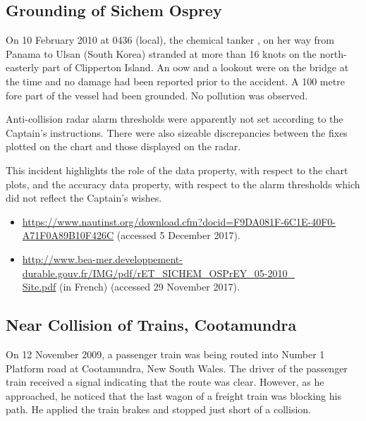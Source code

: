 \subsection{Grounding of Sichem Osprey} \label{bkm:incacc:sichemosprey}
On 10 February 2010 at 0436 (local), the chemical tanker , on her way from Panama to Ulsan (South Korea) stranded at more than 16 knots on the north-easterly part of Clipperton Island. An \gls{oow} and a lookout were on the bridge at the time and no damage had been reported prior to the accident. A 100 metre fore part of the vessel had been grounded. No pollution was observed.

Anti-collision radar alarm thresholds were apparently not set according to the Captain's instructions. There were also sizeable discrepancies between the fixes plotted on the chart and those displayed on the radar.

This incident highlights the role of the  \gls{data property}, with respect to the chart plots, and the \gls{accuracy} \gls{data property}, with respect to the alarm thresholds which did not reflect the Captain's wishes.

\begin{samepage}
\begin{itemize}
	\item \raggedright{\href{https://www.nautinst.org/download.cfm?docid=F9DA081F-6C1E-40F0-A71F0A89B10F426C}{https://www.nautinst.org/download.cfm?docid=F9DA081F-6C1E-40F0-A71F0A89B10F426C} (accessed 5 December 2017).}
  \item \raggedright{\href{http://www.bea-mer.developpement-durable.gouv.fr/IMG/pdf/rET_SICHEM_OSPrEY_05-2010_Site.pdf}{http://www.bea-mer.developpement-durable.gouv.fr/IMG/pdf/rET\_SICHEM\_OSPrEY\_05-2010\_\\Site.pdf} (in French) (accessed 29 November 2017).}
\end{itemize}
\end{samepage}


\subsection{Near Collision of Trains, Cootamundra} \label{bkm:incacc:cootamundra}
On 12 November 2009, a passenger train was being routed into Number 1 Platform road at Cootamundra, New South Wales. The driver of the passenger train received a signal indicating that the route was clear. However, as he approached, he noticed that the last wagon of a freight train was blocking his path. He applied the train brakes and stopped just short of a collision.

